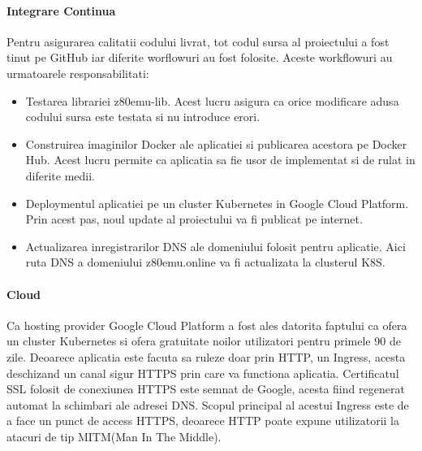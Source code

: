 \documentclass[titlepage,12pt]{article}
\DeclareRobustCommand{\code}[1]{{\ttfamily\small #1}}
\begin{document}
\paragraph{Integrare Continua}
Pentru asigurarea calitatii codului livrat, tot codul sursa al proiectului a fost tinut pe GitHub iar diferite worflowuri au fost folosite.
Aceste workflowuri au urmatoarele responsabilitati:
\begin{itemize}
    \item Testarea librariei \code{z80emu-lib}. Acest lucru asigura ca orice modificare adusa codului sursa este testata si nu introduce erori.
    \item Construirea imaginilor Docker ale aplicatiei si publicarea acestora pe Docker Hub. Acest lucru permite ca aplicatia sa fie usor de implementat si de rulat in diferite medii.
    \item Deploymentul aplicatiei pe un cluster Kubernetes in Google Cloud Platform. Prin acest pas, noul update al proiectului va fi publicat pe internet.
    \item Actualizarea inregistrarilor DNS ale domeniului folosit pentru aplicatie. Aici ruta DNS a domeniului \code{z80emu.online} va fi actualizata la clusterul K8S.
\end{itemize}

\paragraph{Cloud}
Ca hosting provider Google Cloud Platform a fost ales datorita faptului ca ofera un cluster Kubernetes si ofera gratuitate noilor utilizatori pentru primele 90 de zile.
Deoarece aplicatia este facuta sa ruleze doar prin HTTP, un Ingress, acesta deschizand un canal sigur HTTPS prin care va functiona aplicatia.
Certificatul SSL folosit de conexiunea HTTPS este semnat de Google, acesta fiind regenerat automat la schimbari ale adresei DNS.
Scopul principal al acestui Ingress este de a face un punct de access HTTPS, deoarece HTTP poate expune utilizatorii la atacuri de tip MITM(Man In The Middle).
\end{document}
